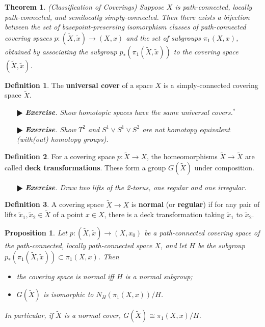 \documentclass[11pt]{amsart}
\newtheorem*{theorem*}{Theorem}
\newtheorem*{proposition*}{Proposition}
\theoremstyle{definition}
\newtheorem*{definition*}{Definition}
\renewcommand\tilde{\widetilde}
\renewcommand\:{\colon}
\newcommand{\1}{\mathds{1}}
\newcommand{\exc}[1]{\vspace{-2.5pt}\begin{itemize}[leftmargin=15pt]\item[$\RHD$] \textit{\textbf{Exercise}. #1}\end{itemize}}
\begin{document}
\begin{theorem*}
	\textnormal{(Classification of Coverings)} Suppose $X$ is path-connected, locally path-connected, and semilocally simply-connected. Then there exists a bijection between the set of basepoint-preserving isomorphism classes of path-connected covering spaces $p\: (\tilde X, \tilde x) \to (X, x)$ and the set of subgroups $\pi_1(X, x)$, obtained by associating the subgroup $p_*(\pi_1(\tilde X, \tilde x))$ to the covering space $(\tilde X, \tilde x)$.
\end{theorem*}

\begin{definition*}
	The \textbf{universal cover} of a space $X$ is a simply-connected covering space $\tilde X$.
\end{definition*}
\exc{Show homotopic spaces have the same universal covers.$^*$}
\exc{Show $T^2$ and $S^1 \vee S^1 \vee S^2$ are not homotopy equivalent \textnormal{(}with\textnormal{(}out\textnormal{)} homotopy groups\textnormal{)}.}

\begin{definition*}
	For a covering space $p\: \tilde X \to X$, the homeomorphisms $\tilde X \to \tilde X$ are called \textbf{deck transformations}. These form a group $G(\tilde X)$ under composition.
\end{definition*}

\exc{Draw two lifts of the 2-torus, one regular and one irregular.}

\begin{definition*}
	A covering space $\tilde X \to X$ is \textbf{normal} (or \textbf{regular}) if for any pair of lifts $\tilde x_1, \tilde x_2 \in \tilde X$ of a point $x \in X$, there is a deck transformation taking $\tilde x_1$ to $\tilde x_2$.
\end{definition*}

\begin{proposition*}
	Let $p\: (\tilde X, \tilde x) \to (X, x_0)$ be a path-connected covering space of the path-connected, locally path-connected space $X$, and let $H$ be the subgroup $p_*(\pi_1(\tilde X, \tilde x)) \subset \pi_1(X, x)$. Then
	\begin{itemize}[leftmargin=*]\setlength\itemsep{0em}
		\item the covering space is normal iff $H$ is a normal subgroup;
		\item $G(\tilde X)$ is isomorphic to $N_H(\pi_1(X,x))/H$.
	\end{itemize}
	In particular, if $\tilde X$ is a normal cover, $G(\tilde X) \cong \pi_1(X,x)/H$.
\end{proposition*}
\end{document}
